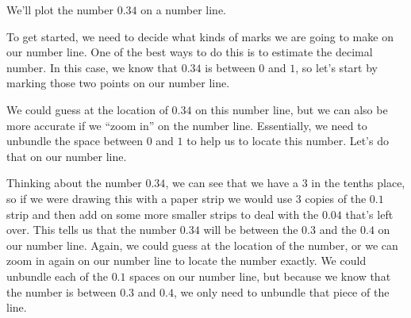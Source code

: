 \documentclass{ximera}
\begin{document}
\begin{example}
We'll plot the number $0.34$ on a number line.

To get started, we need to decide what kinds of marks we are going to make on our number line. One of the best ways to do this is to estimate the decimal number. In this case, we know that $0.34$ is between $0$ and $1$, so let's start by marking those two points on our number line.

\begin{center}
\end{center}

We could guess at the location of $0.34$ on this number line, but we can also be more accurate if we ``zoom in'' on the number line. Essentially, we need to unbundle the space between $0$ and $1$ to help us to locate this number. Let's do that on our number line.

\begin{center}
\end{center}

Thinking about the number $0.34$, we can see that we have a $3$ in the tenths place, so if we were drawing this with a paper strip we would use $3$ copies of the $0.1$ strip and then add on some more smaller strips to deal with the $0.04$ that's left over. This tells us that the number $0.34$ will be between the $0.3$ and the $0.4$ on our number line. Again, we could guess at the location of the number, or we can zoom in again on our number line to locate the number exactly. We could unbundle each of the $0.1$ spaces on our number line, but because we know that the number is between $0.3$ and $0.4$, we only need to unbundle that piece of the line.


\end{example}
\end{document}
